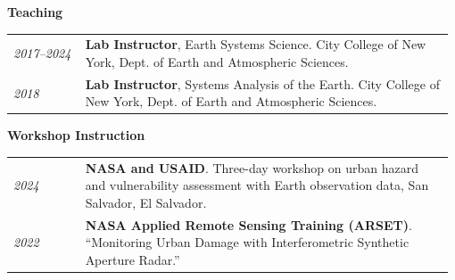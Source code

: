 \documentclass[letterpaper,11pt,oneside]{article}
\newcommand{\datefmt}[1]{\textit{#1}}
\begin{document}
\begin{flushleft}\textbf{\Large{Teaching}}\end{flushleft}
\vspace{-4ex}
\begin{longtable}{@{}p{0.16\linewidth}p{0.82\linewidth}@{}}

\datefmt{2017–2024} & \textbf{Lab Instructor}, Earth Systems Science. City College of New York, Dept. of Earth and Atmospheric Sciences.\\[1.0ex]

\datefmt{2018} & \textbf{Lab Instructor}, Systems Analysis of the Earth. City College of New York, Dept. of Earth and Atmospheric Sciences.\\[1.0ex]

\end{longtable}
\vspace{-4ex}

\begin{flushleft}\textbf{\Large{Workshop Instruction}}\end{flushleft}
\vspace{-4ex}
\begin{longtable}{@{}p{0.16\linewidth}p{0.82\linewidth}@{}}

\datefmt{2024} & \textbf{NASA and USAID}. Three-day workshop on urban hazard and vulnerability assessment with Earth observation data, San Salvador, El Salvador.\\[1.0ex]

\datefmt{2022} & \textbf{NASA Applied Remote Sensing Training (ARSET)}. “Monitoring Urban Damage with Interferometric Synthetic Aperture Radar.”\\[1.0ex]

\end{longtable}
\vspace{-4ex}
\end{document}
